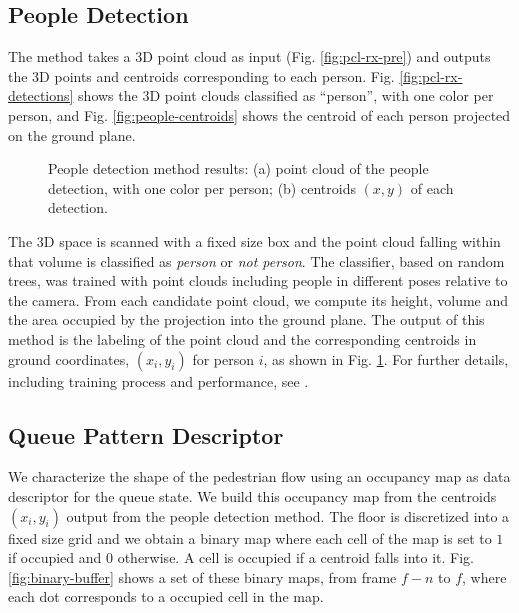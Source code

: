 \subsection{People Detection}
\label{sec:detection}
%
The method takes a 3D point cloud as input (Fig. \ref{fig:pcl-rx-pre}) and outputs the 3D points and centroids corresponding to each person. Fig. \ref{fig:pcl-rx-detections} shows the 3D point clouds classified as ``person'', with one color per person, and Fig. \ref{fig:people-centroids} shows the centroid of each person projected on the ground plane.
\begin{figure}[htb]
\centering
{}
\caption{People detection method results: (a) point cloud of the people detection, with one color per person; (b) centroids $(x,y)$ of each detection.}
\label{fig:detection-out}
\end{figure}

The 3D space is scanned with a fixed size box and the point cloud falling within that volume is classified as \emph{person} or \emph{not person}.
The classifier, based on random trees, was trained with point clouds including people in different poses relative to the camera.
From each candidate point cloud, we compute its height, volume and the area occupied by the projection into the ground plane.
The output of this method is the labeling of the point cloud and the corresponding centroids in ground coordinates, $(x_i, y_i)$ for person $i$, as shown in Fig. \ref{fig:detection-out}.
For further details, including training process and performance, see \cite{carvalho2016detecting}.
%
\subsection{Queue Pattern Descriptor}
\label{sec:occ_map}
We characterize the shape of the pedestrian flow using an occupancy map as data descriptor for the queue state. 
We build this occupancy map from the centroids $(x_i, y_i)$ output from the people detection method.
%
The floor is discretized into a fixed size grid and we obtain a binary map where each cell of the map is set to $1$ if occupied and $0$ otherwise. 
A cell is occupied if a centroid falls into it.
Fig. \ref{fig:binary-buffer} shows a set of these binary maps, from frame $f-n$ to $f$, where each dot corresponds to a occupied cell in the map.


